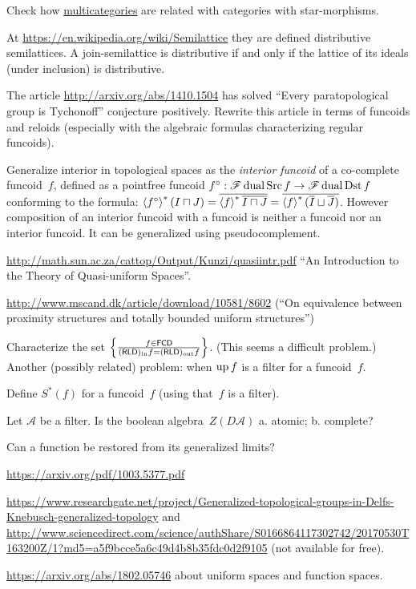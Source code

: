 \documentclass{amsart}
\begin{document}
Check how \href{http://ncatlab.org/nlab/show/multicategory}{multicategories}
are related with categories with star-morphisms.

At \url{https://en.wikipedia.org/wiki/Semilattice} they are defined distributive
semilattices. A join-semilattice is distributive if and only if the lattice of its ideals (under inclusion) is distributive.

The article \url{http://arxiv.org/abs/1410.1504} has solved ``Every paratopological group is Tychonoff'' conjecture positively.
Rewrite this article in terms of funcoids and reloids (especially with the algebraic formulas characterizing regular funcoids).

Generalize interior in topological spaces as the \emph{interior funcoid} of a co-complete funcoid~$f$, defined as a pointfree funcoid
$f^\circ: \mathscr{F}\operatorname{dual}\operatorname{Src} f \rightarrow \mathscr{F}\operatorname{dual}\operatorname{Dst} f$ conforming to the formula:
$\left\langle f^{\circ}\right\rangle ^{\ast} (I \sqcap J) = \overline{\left\langle f\right\rangle ^{\ast} \overline{I \sqcap J}} = \overline{\left\langle f\right\rangle ^{\ast} ( \overline{I} \sqcup \overline{J} )}$.
However composition of an interior funcoid with a funcoid is neither a funcoid nor an interior funcoid.
It can be generalized using pseudocomplement.

\url{http://math.sun.ac.za/cattop/Output/Kunzi/quasiintr.pdf} ``An Introduction to the Theory of Quasi-uniform Spaces''.

\url{http://www.mscand.dk/article/download/10581/8602} (``On equivalence between proximity structures and totally bounded uniform structures'')

Characterize the set $\left\{ \frac{f\in\mathsf{FCD}}{(\mathsf{RLD})_{\mathrm{in}} f=(\mathsf{RLD})_{\mathrm{out}} f}\right\}$. (This seems a difficult problem.)
Another (possibly related) problem: when $\operatorname{up} f$ is a filter for a funcoid~$f$.

Define $S^\ast (f)$ for a funcoid~$f$ (using that~$f$ is a filter).

Let $\mathcal{A}$ be a filter. Is the boolean algebra~$Z(D\mathcal{A})$
a. atomic; b. complete?

Can a function be restored from its generalized limits?

\url{https://arxiv.org/pdf/1003.5377.pdf}

\url{https://www.researchgate.net/project/Generalized-topological-groups-in-Delfs-Knebusch-generalized-topology}
and
\url{http://www.sciencedirect.com/science/authShare/S0166864117302742/20170530T163200Z/1?md5=a5f9bcce5a6c49d4b8b35fdc0d2f9105}
(not available for free).

\url{https://arxiv.org/abs/1802.05746} about uniform spaces and
function spaces.
\end{document}
